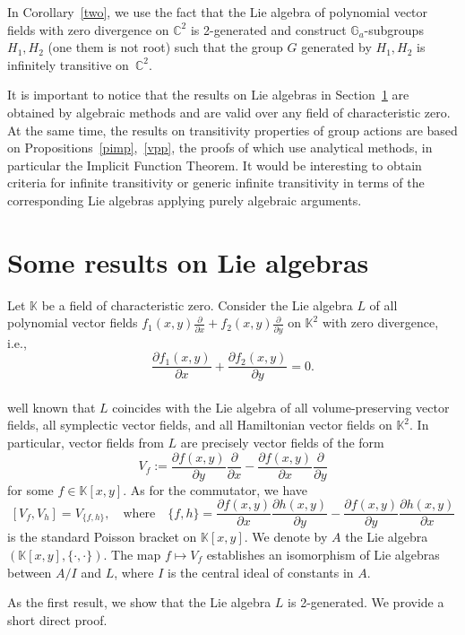 \documentclass[a4paper,draft,reqno,12pt]{amsart}
\theoremstyle{definition}
\theoremstyle{remark}
\def\GG{{\mathbb G}}
\def\CC{{\mathbb C}}
\def\KK{{\mathbb K}}
\begin{document}
In Corollary~\ref{two}, we use the fact that the Lie algebra of polynomial vector fields with zero divergence on $\CC^2$ is 2-generated and construct $\GG_a$-subgroups $H_1, H_2$ (one them is not root) such that the group $G$ generated by $H_1, H_2$ is infinitely transitive on~$\CC^2$. 

It is important to notice that the results on Lie algebras in Section~\ref{sec2} are obtained by algebraic methods and are valid over any field of characteristic zero. At the same time, the results on transitivity properties of group actions are based on Propositions~\ref{pimp},~\ref{vpp}, the proofs of which use analytical methods, in particular the Implicit Function Theorem. It would be interesting to obtain criteria for infinite transitivity or generic infinite transitivity in terms of the corresponding Lie algebras applying purely algebraic arguments.
 
\section{Some results on Lie algebras}
\label{sec2}

Let $\KK$ be a field of characteristic zero. Consider the Lie algebra $L$ of all polynomial vector fields $f_1(x,y)\frac{\partial}{\partial x}+f_2(x,y)\frac{\partial}{\partial y}$ on $\KK^2$ with zero divergence, i.e.,
$$
\frac{\partial f_1(x,y)}{\partial x}+\frac{\partial f_2(x,y)}{\partial y}=0. 
$$
\\
 well known that $L$ coincides with the Lie algebra of all volume-preserving vector fields, all symplectic vector fields, and all Hamiltonian vector fields on $\KK^2$. In particular,  vector fields from $L$ are precisely vector fields of the form
$$
V_f:=\frac{\partial f(x,y)}{\partial y}\frac{\partial}{\partial x}-\frac{\partial f(x,y)}{\partial x}\frac{\partial}{\partial y}
$$
for some $f\in\KK[x,y]$. As for the commutator, we have
$$
[V_f, V_h]=V_{\{f,h\}}, \quad \text{where} \quad \{f,h\}=\frac{\partial f(x,y)}{\partial x}\frac{\partial h(x,y)}{\partial y}-\frac{\partial f(x,y)}{\partial y}\frac{\partial h(x,y)}{\partial x}
$$
is the standard Poisson bracket on $\KK[x,y]$. We denote by $A$ the Lie algebra  $(\KK[x,y], \{\cdot, \cdot\})$. 
The map $f\mapsto V_f$ establishes an isomorphism of Lie algebras between $A/I$ and $L$, where $I$ is the central ideal of constants in $A$.

\smallskip

As the first result, we show that the Lie algebra $L$ is 2-generated. We provide a short direct proof. 
\end{document}
